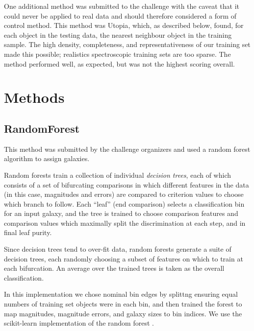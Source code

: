 \documentclass[twocolumn,twocolappendix]{aastex63}
\begin{document}
One additional method was submitted to the challenge with the caveat that it could
never be applied to real data and should therefore considered a form of control method.
This method was {\sc Utopia}, which, as described below, found, for each object in the testing data, the
nearest neighbour object in the training sample.  The high density, completeness, and
representativeness of our training set made this possible; realistics spectroscopic training
sets are too sparse.  The method performed well, as expected, 
but was not the highest scoring overall.


\section{Methods}

\subsection{ {\sc RandomForest} } \label{sec:randomforest}
This method was submitted by the challenge organizers and used a random
forest algorithm to assign galaxies.

Random forests \citep{breiman2001} train a collection of individual \emph{decision trees},
each of which consists of a set of bifurcating comparisons in which different features in
the data (in this case, magnitudes and errors) are compared to criterion values to choose
which branch to follow.  Each ``leaf'' (end comparison) selects a classification bin for
an input galaxy, and the tree is trained to choose comparison features and comparison values
which maximally split the discrimination at each step, and in final leaf purity.

Since decision trees tend to over-fit data, random forests generate a suite of decision
trees, each randomly choosing a subset of features on which to train at each bifurcation.
An average over the trained trees is taken as the overall classification.

In this implementation we chose nominal bin edges by splittng ensuring equal numbers of training set 
objects were in each bin, and then trained the forest to map magnitudes, magnitude errors, and
galaxy sizes to bin indices.  We use the {\sc scikit-learn} implementation of the random forest
\citep{scikit-learn}.


\end{document}
